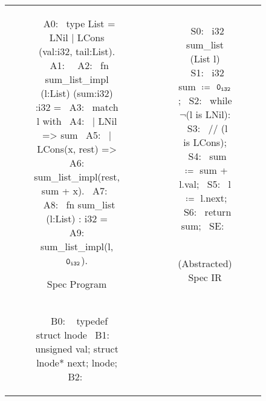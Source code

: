 \begin{figure}
\begin{tabular}{@{}c@{}c@{}}
\begin{subfigure}[b]{0.63\textwidth}
\begin{center}
\begin{allLangEnvFoot}
~{\scriptsize \textcolor{mygray}{A0:}}~ type List = LNil | LCons (val:i32, tail:List).
~{\scriptsize \textcolor{mygray}{A1:}}~
~{\scriptsize \textcolor{mygray}{A2:}}~ fn sum_list_impl (l:List) (sum:i32) :i32 =
~{\scriptsize \textcolor{mygray}{A3:}}~    match l with
~{\scriptsize \textcolor{mygray}{A4:}}~    | LNil => sum
~{\scriptsize \textcolor{mygray}{A5:}}~    | LCons(x, rest) =>
~{\scriptsize \textcolor{mygray}{A6:}}~                sum_list_impl(rest, sum + x).
~{\scriptsize \textcolor{mygray}{A7:}}~
~{\scriptsize \textcolor{mygray}{A8:}}~ fn sum_list (l:List) : i32 =
~{\scriptsize \textcolor{mygray}{A9:}}~    sum_list_impl(l, ${\tt 0_{i32}}$).
\end{allLangEnvFoot}
\end{center}
\caption{\label{fig:llTraverseSpec}Spec Program}
\end{subfigure}%
&
\begin{subfigure}[b]{0.37\textwidth}
\begin{center}
\begin{allLangEnvFoot}
~{\scriptsize \textcolor{mygray}{S0:}}~ i32 sum_list (List l) {
~{\scriptsize \textcolor{mygray}{S1:}}~   i32 sum $\coloneqq$ ${\tt 0_{i32}}$;
~{\scriptsize \textcolor{mygray}{S2:}}~   while $\neg$(l is LNil):
~{\scriptsize \textcolor{mygray}{S3:}}~     // (l is LCons);
~{\scriptsize \textcolor{mygray}{S4:}}~     sum $\coloneqq$ sum + l.val;
~{\scriptsize \textcolor{mygray}{S5:}}~     l   $\coloneqq$ l.next;
~{\scriptsize \textcolor{mygray}{S6:}}~   return sum;
~{\scriptsize \textcolor{mygray}{SE:}}~ }
~{\scriptsize \textcolor{mygray}{}}~
~{\scriptsize \textcolor{mygray}{}}~
\end{allLangEnvFoot}
\end{center}
\caption{\label{fig:llTraverseSpecIR}(Abstracted) Spec IR}
\end{subfigure}%
\\
\begin{subfigure}[b]{0.63\textwidth}
\begin{center}
\begin{allLangEnvFoot}
~{\scriptsize \textcolor{mygray}{B0: }}~ typedef struct lnode {
~{\scriptsize \textcolor{mygray}{B1: }}~   unsigned val; struct lnode* next; } lnode;
~{\scriptsize \textcolor{mygray}{B2: }}~ 

\end{allLangEnvFoot}
\end{center}
\end{subfigure}
\end{tabular}
\end{figure}
